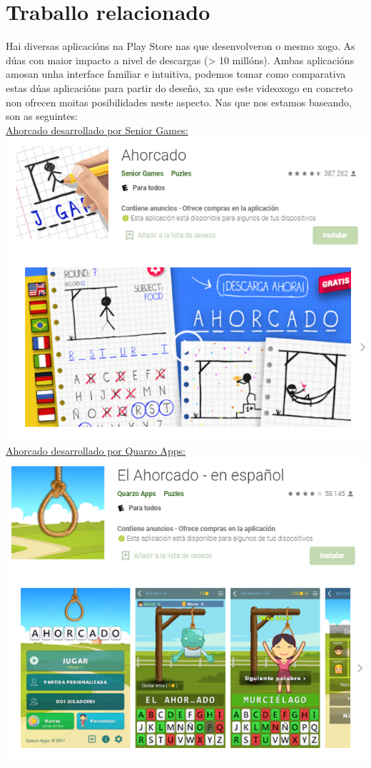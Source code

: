 \section{Traballo relacionado}
Hai diversas aplicacións na Play Store nas que desenvolveron o mesmo xogo.
As dúas con maior impacto a nivel de descargas (> 10 millóns). Ambas aplicacións amosan unha interface familiar e intuitiva, podemos tomar como comparativa estas dúas aplicacións para partir do deseño, xa que este videoxogo en concreto non ofrecen moitas posibilidades neste aspecto. Nas que nos estamos baseando, son as seguintes:\\[100 pt]
\href{https://play.google.com/store/apps/details?id=com.tellmewow.senior.hangman&hl=es&gl=US}{Ahorcado desarrollado por Senior Games:}\\
\includegraphics[scale=0.65]{imaxes/app1.png}\\[12 pt]

\href{https://play.google.com/store/apps/details?id=com.quarzo.hangmanwords&hl=es&gl=US}{Ahorcado desarrollado por Quarzo Apps:}\\
\includegraphics[scale=0.65]{imaxes/app2.png}\\[12 pt]
 \let\cleardoublepage=\clearpage 
 
 

